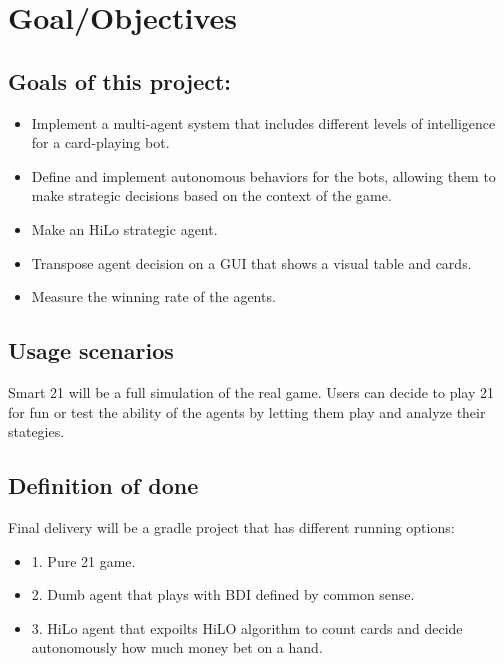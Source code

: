 \chapter{Goal/Objectives}
\label{ch:goal} %
\section{Goals of this project:}
\begin{itemize}
    \item Implement a multi-agent system that includes different levels of intelligence for a card-playing bot.
    \item Define and implement autonomous behaviors for the bots, allowing them to make strategic decisions based on the context of the game.
    \item Make an HiLo strategic agent.
    \item Transpose agent decision on a GUI that shows a visual table and cards.
    \item Measure the winning rate of the agents.
\end{itemize}

\section{Usage scenarios}

Smart 21 will be a full simulation of the real game. Users can decide to play 21 for fun or test the ability of the agents by letting them play and analyze their stategies.  

\section{Definition of done}

Final delivery will be a gradle project that has different running options:

\begin{itemize}
    \item 1. Pure 21 game.
    \item 2. Dumb agent that plays with BDI defined by common sense.
    \item 3. HiLo agent that expoilts HiLO algorithm to count cards and decide autonomously how much money bet on a hand.
\end{itemize}

